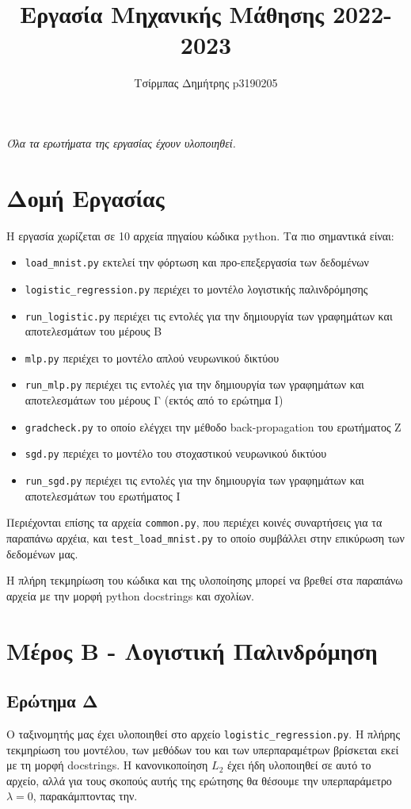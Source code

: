 \documentclass{article}
\title{Εργασία Μηχανικής Μάθησης 2022-2023}
\author{Τσίρμπας Δημήτρης p3190205}
\newcommand{\code}{\texttt}
\begin{document}
	
\maketitle

\begin{center}
	\textit{Όλα τα ερωτήματα της εργασίας έχουν υλοποιηθεί.}
\end{center}

\section{Δομή Εργασίας}
Η εργασία χωρίζεται σε 10 αρχεία πηγαίου κώδικα python. Τα πιο σημαντικά είναι:
\begin{itemize}
	\item \code{load\_mnist.py} εκτελεί την φόρτωση και προ-επεξεργασία των δεδομένων 
	\item \code{logistic\_regression.py} περιέχει το μοντέλο λογιστικής παλινδρόμησης
	\item \code{run\_logistic.py} περιέχει τις εντολές για την δημιουργία των γραφημάτων και αποτελεσμάτων του μέρους Β
	\item \code{mlp.py} περιέχει το μοντέλο απλού νευρωνικού δικτύου 
	\item \code{run\_mlp.py} περιέχει τις εντολές για την δημιουργία των γραφημάτων και αποτελεσμάτων του μέρους Γ (εκτός από το ερώτημα I)
	\item \code{gradcheck.py} το οποίο ελέγχει την μέθοδο back-propagation του ερωτήματος Ζ
	\item \code{sgd.py} περιέχει το μοντέλο του στοχαστικού νευρωνικού δικτύου 
	\item \code{run\_sgd.py}  περιέχει τις εντολές για την δημιουργία των γραφημάτων και αποτελεσμάτων του ερωτήματος I
\end{itemize}

Περιέχονται επίσης τα αρχεία \code{common.py}, που περιέχει κοινές συναρτήσεις για τα παραπάνω αρχέια, και \code{test\_load\_mnist.py} το οποίο συμβάλλει στην επικύρωση των δεδομένων μας.

Η πλήρη τεκμηρίωση του κώδικα και της υλοποίησης μπορεί να βρεθεί στα παραπάνω αρχεία με την μορφή python docstrings και σχολίων.


\section{Μέρος Β - Λογιστική Παλινδρόμηση}

\subsection{Ερώτημα Δ}
Ο ταξινομητής μας έχει υλοποιηθεί στο αρχείο \code{logistic\_regression.py}. Η πλήρης τεκμηρίωση του μοντέλου, των μεθόδων του και των υπερπαραμέτρων βρίσκεται εκεί με τη μορφή docstrings. Η κανονικοποίηση $L_{2}$ έχει ήδη υλοποιηθεί σε αυτό το αρχείο, αλλά για τους σκοπούς αυτής της ερώτησης θα θέσουμε την υπερπαράμετρο \code{$\lambda = 0$}, παρακάμπτοντας την.
\end{document}
